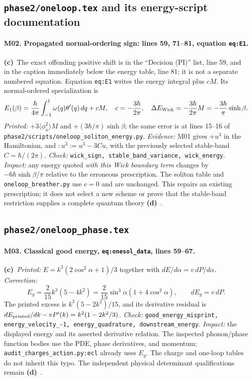 \documentclass[11pt,a4paper]{article}
\newcommand{\C}{\textbf{(c)}\ }
\newcommand{\D}{\textbf{(d)}\ }
\newcommand{\file}[1]{\nolinkurl{#1}}
\newcommand{\test}[1]{\textit{Check:} \file{#1}.}
\begin{document}
\subsection{\file{phase2/oneloop.tex} and its energy-script documentation}
\paragraph{M02. Propagated normal-ordering sign: lines 59, 71--81, equation \file{eq:E1}.}
\C The exact offending positive shift is in the ``Decision (PI)'' list,
line 59, and in the caption immediately below the energy table, line 81;
it is not a separate numbered equation. Equation \file{eq:E1} writes the
energy integral plus $cM$. Its normal-ordered specialization is
\[
 E_1(\beta)=\frac{\hbar}{4\pi}\int_{-1}^{1}\omega(q)\theta'(q)\,dq+cM,
 \quad c=-\frac{3\hbar}{2\pi},\quad
 \Delta E_{\rm Wick}=-\frac{3\hbar}{2\pi}M
                  =-\frac{3\hbar}{\pi}\sinh\beta.
\]
\textit{Printed:} $+3\langle\phi_x^2\rangle M$ and
$+(3\hbar/\pi)\sinh\beta$; the same error is at lines 15--16 of
\file{phase2/scripts/oneloop_soliton_energy.py}.
\textit{Evidence:} M01 gives $+u^3$ in the Hamiltonian, and
$:u^3:=u^3-3Cu$, with the previously selected stable-band
$C=\hbar/(2\pi)$. \test{wick_sign, stable_band_variance, wick_energy}
\textit{Impact:} any energy quoted \emph{with this Wick boundary term}
changes by $-6\hbar\sinh\beta/\pi$ relative to the erroneous prescription.
The soliton table and \file{oneloop_breather.py} use $c=0$ and are unchanged.
This repairs an existing prescription; it does not select a new scheme or
prove that the stable-band restriction supplies a complete quantum theory \D.

\subsection{\file{phase2/oneloop_phase.tex}}
\paragraph{M03. Classical good energy, \file{eq:onesol_data}, lines 59--67.}
\C \textit{Printed:} $E=k^3(2\cos^2\alpha+1)/3$ together with
$dE/d\alpha=v\,dP/d\alpha$. \textit{Correction:}
\[
 E_g=\frac2{15}k^3(5-4k^2)
     =\frac2{15}\sin^3\alpha(1+4\cos^2\alpha),\qquad dE_g=v\,dP.
\]
The printed excess is $k^3(5-2k^2)/15$, and its derivative residual is
$dE_{\rm printed}/dk-vP'(k)=k^2(1-2k^2/3)$.
\test{good_energy_misprint, energy_velocity_-1, energy_quadrature, downstream_energy}
\textit{Impact:} the displayed energy and its asserted derivative relation.
The inspected phonon/phase function bodies use the PDE, phase derivatives,
and momentum; \file{audit_charges_action.py:ecl} already uses $E_g$.
The charge and one-loop tables do not inherit this typo. The independent
physical determinant qualifications remain \D.
\end{document}
